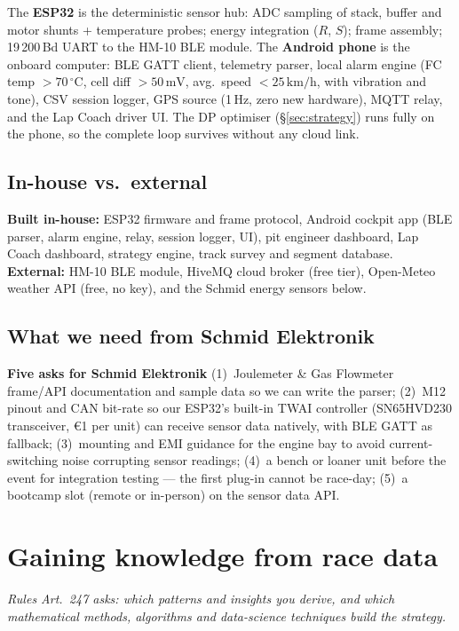 \documentclass[11pt,a4paper]{article}
\newcommand{\tenpt}{\fontsize{10}{12}\selectfont}
\newcommand{\question}[1]{\vspace{-0.15em}%
  {\tenpt\color{graphite}\itshape Rules Art.~247 asks: #1}\par\vspace{0.3em}}
\begin{document}
The \textbf{ESP32} is the deterministic sensor hub: ADC sampling of stack,
buffer and motor shunts + temperature probes; energy integration ($R$, $S$);
frame assembly; 19\,200\,Bd UART to the HM-10 BLE module. The
\textbf{Android phone} is the onboard computer: BLE GATT client, telemetry
parser, local alarm engine (FC temp $>70\,^{\circ}$C, cell diff
$>50\,\mathrm{mV}$, avg.\ speed $<25\,\mathrm{km/h}$, with vibration and
tone), CSV session logger, GPS source (1\,Hz, zero new hardware), MQTT relay,
and the Lap Coach driver UI. The DP optimiser (\S\ref{sec:strategy}) runs
fully on the phone, so the complete loop survives without any cloud link.

\subsection{In-house vs.\ external}

\textbf{Built in-house:} ESP32 firmware and frame protocol, Android cockpit
app (BLE parser, alarm engine, relay, session logger, UI), pit engineer
dashboard, Lap Coach dashboard, strategy engine, track survey and segment
database.\\
\textbf{External:} HM-10 BLE module, HiveMQ cloud broker (free tier),
Open-Meteo weather API (free, no key), and the Schmid energy sensors below.

\subsection{What we need from Schmid Elektronik}

\begin{tcolorbox}[swisspanel]
\tenpt\color{ink}\textbf{Five asks for Schmid Elektronik}\quad\color{graphite}%
(1)~Joulemeter \& Gas Flowmeter frame/API documentation and sample data so
we can write the parser;
(2)~M12 pinout and CAN bit-rate so our ESP32's built-in TWAI controller
(SN65HVD230 transceiver, €1 per unit) can receive sensor data natively, with
BLE GATT as fallback;
(3)~mounting and EMI guidance for the engine bay to avoid current-switching
noise corrupting sensor readings;
(4)~a bench or loaner unit before the event for integration testing — the
first plug-in cannot be race-day;
(5)~a bootcamp slot (remote or in-person) on the sensor data API.
\end{tcolorbox}

\section{Gaining knowledge from race data}
\label{sec:knowledge}
\question{which patterns and insights you derive, and which mathematical
methods, algorithms and data-science techniques build the strategy.}
\end{document}
